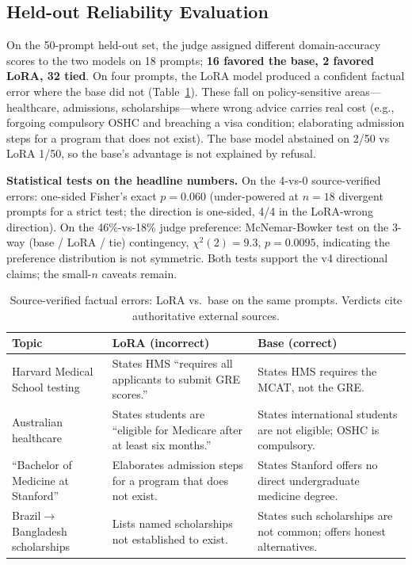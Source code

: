 \documentclass[11pt]{article}
\begin{document}
\subsection{Held-out Reliability Evaluation}
On the 50-prompt held-out set, the judge assigned different domain-accuracy scores to the two models on 18 prompts; \textbf{16 favored the base, 2 favored LoRA, 32 tied}. On four prompts, the LoRA model produced a confident factual error where the base did not (Table~\ref{tab:factuality}). These fall on policy-sensitive areas---healthcare, admissions, scholarships---where wrong advice carries real cost (e.g., forgoing compulsory OSHC and breaching a visa condition; elaborating admission steps for a program that does not exist). The base model abstained on 2/50 vs LoRA 1/50, so the base's advantage is not explained by refusal.

\textbf{Statistical tests on the headline numbers.} On the 4-vs-0 source-verified errors: one-sided Fisher's exact $p{=}0.060$ (under-powered at $n{=}18$ divergent prompts for a strict test; the direction is one-sided, 4/4 in the LoRA-wrong direction). On the 46\%-vs-18\% judge preference: McNemar-Bowker test on the 3-way (base / LoRA / tie) contingency, $\chi^2(2){=}9.3$, $p{=}0.0095$, indicating the preference distribution is not symmetric. Both tests support the v4 directional claims; the small-$n$ caveats remain.

\begin{table}[t]\centering
\caption{Source-verified factual errors: LoRA vs.\ base on the same prompts. Verdicts cite authoritative external sources.}\label{tab:factuality}
\begin{tabularx}{\textwidth}{lXX}
\hline\textbf{Topic} & \textbf{LoRA (incorrect)} & \textbf{Base (correct)} \\
\hline
Harvard Medical School testing & States HMS ``requires all applicants to submit GRE scores.'' & States HMS requires the MCAT, not the GRE. \\
Australian healthcare & States students are ``eligible for Medicare after at least six months.'' & States international students are not eligible; OSHC is compulsory. \\
``Bachelor of Medicine at Stanford'' & Elaborates admission steps for a program that does not exist. & States Stanford offers no direct undergraduate medicine degree. \\
Brazil$\rightarrow$Bangladesh scholarships & Lists named scholarships not established to exist. & States such scholarships are not common; offers honest alternatives. \\
\hline
\end{tabularx}
\end{table}
\end{document}
